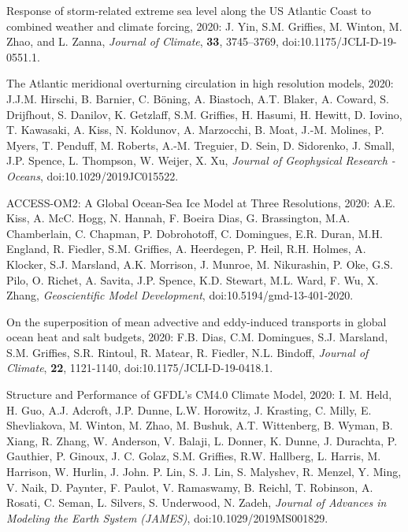 \begin{etaremune}


\item Response of storm-related extreme sea level along the US Atlantic Coast to combined weather and climate forcing, 2020: J. Yin, S.M. Grif\/f\/ies, M. Winton, M. Zhao, and L. Zanna, {\it Journal of Climate}, {\bf 33}, 3745--3769, doi:10.1175/JCLI-D-19-0551.1.

\item The Atlantic meridional overturning circulation in high resolution models, 2020: J.J.M. Hirschi, B. Barnier, C. {B\"{o}ning}, A. Biastoch, A.T. Blaker, A. Coward, S. Drijfhout, S. Danilov, K. Getzlaff, S.M. Grif\/f\/ies, H. Hasumi, H. Hewitt, D. Iovino, T. Kawasaki, A. Kiss, N. Koldunov, A. Marzocchi, B. Moat, J.-M. Molines, P. Myers, T. Penduff, M. Roberts, A.-M. Treguier, D. Sein, D. Sidorenko, J. Small, J.P. Spence, L. Thompson, W. Weijer, X. Xu, {\it Journal of Geophysical Research - Oceans}, doi:10.1029/2019JC015522.

\item ACCESS-OM2: A Global Ocean-Sea Ice Model at Three Resolutions, 2020: A.E. Kiss, A. McC. Hogg, N. Hannah, F. Boeira Dias, G. Brassington, M.A. Chamberlain, C. Chapman, P. Dobrohotoff, C. Domingues, E.R. Duran, M.H. England, R. Fiedler, S.M. Grif\/f\/ies,  A. Heerdegen, P. Heil, R.H. Holmes, A. Klocker, S.J. Marsland, A.K. Morrison, J. Munroe, M. Nikurashin, P. Oke, G.S. Pilo, O. Richet, A. Savita, J.P. Spence, K.D. Stewart, M.L. Ward, F. Wu, X. Zhang, {\it Geoscientific Model Development}, doi:10.5194/gmd-13-401-2020.

\item On the superposition of mean advective and eddy-induced transports in global ocean heat and salt budgets, 2020: F.B. Dias, C.M. Domingues, S.J. Marsland, S.M. Grif\/f\/ies, S.R. Rintoul, R. Matear, R. Fiedler, N.L. Bindoff, {\it Journal of Climate}, {\bf 22}, 1121-1140, doi:10.1175/JCLI-D-19-0418.1.

\item Structure and Performance of GFDL's CM4.0 Climate Model, 2020: I. M. Held, H. Guo, A.J. Adcroft, J.P. Dunne, L.W. Horowitz, J. Krasting, C. Milly, E. Shevliakova, M. Winton, M. Zhao, M. Bushuk, A.T. Wittenberg, B. Wyman, B. Xiang, R. Zhang, W. Anderson, V. Balaji, L. Donner, K. Dunne, J. Durachta, P. Gauthier, P. Ginoux, J. C. Golaz, S.M. Griffies, R.W. Hallberg, L.  Harris, M. Harrison, W. Hurlin, J. John. P. Lin, S. J. Lin, S. Malyshev, R. Menzel, Y. Ming, V. Naik, D. Paynter, F. Paulot, V. Ramaswamy, B. Reichl, T. Robinson, A. Rosati, C. Seman, L. Silvers, S. Underwood, N. Zadeh, {\it Journal of Advances in Modeling the Earth System (JAMES)}, doi:10.1029/2019MS001829.


\end{etaremune}
